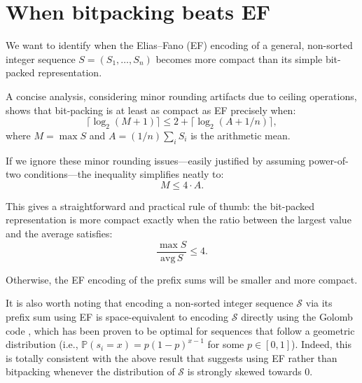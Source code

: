 \section{When bitpacking beats EF}\label{sec:prefixsum}

We want to identify when the Elias–Fano (EF) encoding of a general, non-sorted integer sequence \( S = (S_1,\dots,S_n) \) becomes more compact than its simple bit-packed representation.

A concise analysis, considering minor rounding artifacts due to ceiling operations, shows that bit-packing is at least as compact as EF precisely when:
\[
\lceil\log_2(M + 1)\rceil \leq 2 + \lceil\log_2(A + 1/n)\rceil,
\]
where \( M = \max S \) and \( A = (1/n)\sum_i S_i \) is the arithmetic mean.

If we ignore these minor rounding issues—easily justified by assuming power-of-two conditions—the inequality simplifies neatly to:
\[
M \leq 4 \cdot A.
\]

This gives a straightforward and practical rule of thumb: the bit-packed representation is more compact exactly when the ratio between the largest value and the average satisfies:
\[
\frac{\max S}{\text{avg}\, S} \leq 4.
\]

Otherwise, the EF encoding of the prefix sums will be smaller and more compact.

It is also worth noting that encoding a non-sorted integer sequence $\mathcal S$ via its prefix sum using EF is  space-equivalent to encoding $\mathcal{S}$ directly using the Golomb code \cite{golomb}, which has been proven to be optimal for sequences that follow a geometric distribution (i.e., $\mathbb P(s_i = x) = p( 1- p)^{x-1}$ for some $p \in [0, 1]$). Indeed, this is totally consistent with the above result that suggests using EF rather than bitpacking whenever the distribution of $\mathcal S$ is strongly skewed towards 0.

